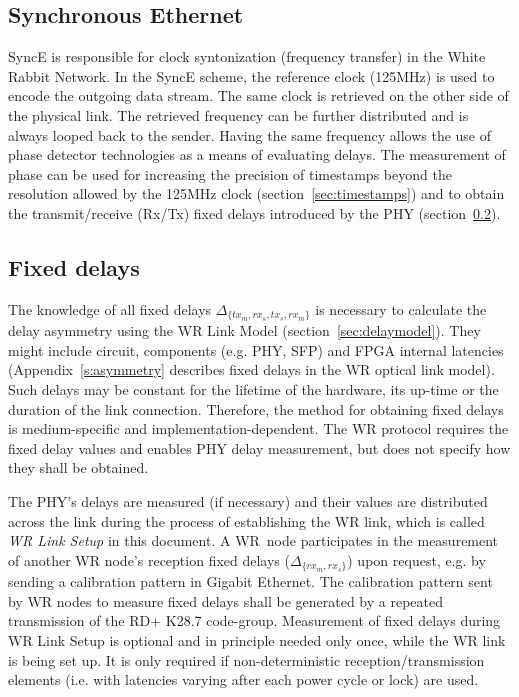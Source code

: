 \documentclass[a4paper, 12pt]{article}
\begin{document}
\subsection{Synchronous Ethernet}
\label{sec:syncE}
SyncE is responsible for clock syntonization (frequency transfer) in the White Rabbit Network. 
In the SyncE scheme, the reference clock (125MHz) is used to encode the outgoing data
stream. The same clock is retrieved on the other side of the physical link.
The retrieved frequency can be further distributed and is always looped back to the sender.
Having the same frequency allows the use of phase detector technologies as a means of evaluating
delays. The measurement of phase can be used for increasing the precision of timestamps 
beyond the resolution allowed by the 125MHz clock (section~\ref{sec:timestamps}) and to obtain 
the transmit/receive (Rx/Tx) fixed delays introduced by the PHY (section~\ref{sec:fixedDelays}).

\subsection{Fixed delays}
\label{sec:fixedDelays}
The knowledge of all fixed delays $\Delta_{\{tx_m, rx_s, tx_s, rx_m\}}$ is necessary to calculate 
the delay asymmetry using the WR Link Model (section~\ref{sec:delaymodel}). They might include circuit, 
components (e.g. PHY, SFP) and FPGA internal latencies (Appendix~\ref{s:asymmetry} describes 
fixed delays in the WR optical link model). Such delays may be constant for 
the lifetime of the hardware, its up-time or the duration of the link connection. Therefore, 
the method for obtaining fixed delays is medium-specific and implementation-dependent. 
The WR protocol requires the fixed delay values and enables PHY delay
measurement, but does not specify how they shall be obtained.

The PHY's delays are measured (if necessary) and their values are distributed across the link during 
the process of establishing the WR link, which is called \textit{WR Link Setup} in this document. 
A WR~node participates in the measurement of another 
WR node's reception fixed delays ($\Delta_{\{rx_m, rx_s\}}$) upon request, e.g. by sending 
a calibration pattern in Gigabit Ethernet. The calibration pattern sent by WR nodes to measure 
fixed delays shall be generated by a repeated transmission of the RD+ K28.7 code-group. 
Measurement of fixed delays during WR Link Setup is optional and in principle needed only once, 
while the WR link is being set up. It is only required if non-deterministic reception/transmission 
elements (i.e. with latencies varying after each power cycle or lock) are used.
\end{document}
